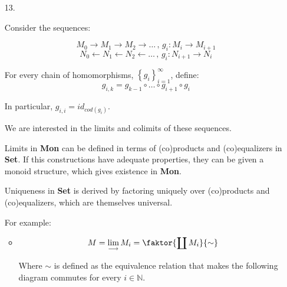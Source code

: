 \documentclass[a4paper,notitlepage]{article}
\begin{document}
\begin{enumerate}
\begin{proof}
\begin{itemize}
\begin{itemize}
          
          $$ U_{f \circ g \circ h} \cong \vert f \circ g \vert^\star (U_h)$$

          $$ U_{f \circ g \circ h} \cong \vert f \vert^\star U_{g\circ h} $$

        \end{itemize}
        
   \end{itemize}

   \end{proof}

   \item[13.]

     Consider the sequences:

     $$ M_0 → M_1 → M_2 → … \, , \, g_i : M_i → M_{i+1} $$
     $$ N_0 ← N_1 ← N_2 ← … \, , \, g_i : N_{i+1} → N_{i} $$
     
     
     For every chain of homomorphisms,  $\left\{g_i\right\}_{i=1}^\infty$, define:
     $$g_{i,k} = g_{k-1} \circ … \circ g_{i+1} \circ g_i$$

     In particular, $g_{i,i} = id_{cod(g_i)}$.


     We are interested in the limits and colimits of these sequences.

     Limits in {\bf Mon} can be defined in terms of (co)products and (co)equalizers
     in {\bf Set}. If this constructions have adequate properties, they
     can be given a monoid structure, which gives existence in {\bf Mon}.

     Uniqueness in {\bf Set} is derived by factoring uniquely
     over (co)products and (co)equalizers, which are themselves universal.

     For example:

     \begin{itemize}
       \item
         
         $$M = \lim_{\longrightarrow} M_i = \faktor{\coprod M_i}{\sim}$$

         Where $\sim$ is defined as the equivalence relation that makes
         the following diagram commutes for every $i \in \mathbb{N}$. 



\end{itemize}
\end{enumerate}
\end{document}
